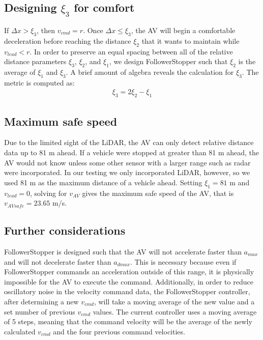 \documentclass[conference]{IEEEtran}
\begin{document}
\subsection{Designing $\xi_3$ for comfort}
If $\Delta x>\xi_3$, then $v_{cmd}=r$. Once $\Delta x\leq \xi_3$, the AV will begin a comfortable deceleration before reaching the distance $\xi_2$ that it wants to maintain while $v_{lead}<r$. In order to preserve an equal spacing between all of the relative distance parameters $\xi_3$, $\xi_2$, and $\xi_1$, we design FollowerStopper such that $\xi_2$ is the average of $\xi_1$ and $\xi_3$. A brief amount of algebra reveals the calculation for $\xi_3$. The metric is computed as:
\begin{eqnarray}
\xi_3 = 2\xi_2-\xi_1
\end{eqnarray}

\subsection{Maximum safe speed}
Due to the limited sight of the LiDAR, the AV can only detect relative distance data up to 81 m ahead. If a vehicle were stopped at greater than 81 m ahead, the AV would not know unless some other sensor with a larger range such as radar were incorporated. In our testing we only incorporated LiDAR, however, so we used 81 m as the maximum distance of a vehicle ahead. Setting $\xi_1=81$ m and $v_{lead}=0$, solving for $v_{AV}$ gives the maximum safe speed of the AV, that is $v_{AVsafe}=23.65$ m/s.

\subsection{Further considerations}
FollowerStopper is designed such that the AV will not accelerate faster than $a_{max}$ and will not decelerate faster than $a_{dmax}$. This is necessary because even if FollowerStopper commands an acceleration outside of this range, it is physically impossible for the AV to execute the command. Additionally, in order to reduce oscillatory noise in the velocity command data, the FollowerStopper controller, after determining a new $v_{cmd}$, will take a moving average of the new value and a set number of previous $v_{cmd}$ values. The current controller uses a moving average of 5 steps, meaning that the command velocity will be the average of the newly calculated $v_{cmd}$ and the four previous command velocities.



\end{document}
